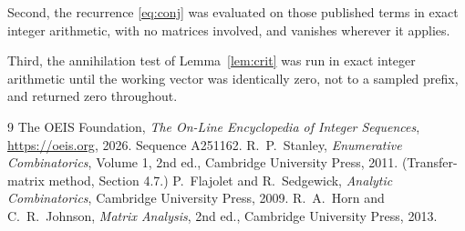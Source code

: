 \documentclass[11pt,a4paper]{article}
\theoremstyle{plain}
\theoremstyle{definition}
\begin{document}
Second, the recurrence \eqref{eq:conj} was evaluated on those published terms in exact
integer arithmetic, with no matrices involved, and vanishes wherever it applies.

Third, the annihilation test of Lemma~\ref{lem:crit} was run in exact integer arithmetic
until the working vector was identically zero, not to a sampled prefix, and returned zero
throughout.

\begin{thebibliography}{9}
 The OEIS Foundation, \emph{The On-Line Encyclopedia of Integer
Sequences}, \url{https://oeis.org}, 2026. Sequence A251162.
 R.~P.~Stanley, \emph{Enumerative Combinatorics}, Volume 1, 2nd ed.,
Cambridge University Press, 2011. (Transfer-matrix method, Section 4.7.)
 P.~Flajolet and R.~Sedgewick, \emph{Analytic Combinatorics}, Cambridge
University Press, 2009.
 R.~A.~Horn and C.~R.~Johnson, \emph{Matrix Analysis}, 2nd ed., Cambridge
University Press, 2013.
\end{thebibliography}
\end{document}
